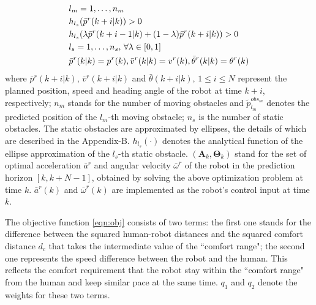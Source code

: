 \documentclass[letterpaper, 10 pt, conference]{ieeeconf}
\begin{document}
\begin{subequations}
\begin{align}
			& l_m=1,\dots,n_m\notag\\
			& h_{l_s}(\bar{p}^r(k+i|k))> 0\label{eqn:constr:safety_s_obs1}\\
			& h_{l_s}(\lambda \bar{p}^r(k+i-1|k)+(1-\lambda)\bar{p}^r(k+i|k))> 0\label{eqn:constr:safety_s_obs2}\\
			& l_s=1,\dots,n_s,\, \forall \lambda\in \left[ 0, 1\right] \notag\\
			& \bar{p}^r(k|k)=p^r(k),\bar{v}^r(k|k)=v^r(k),\bar{\theta}^r(k|k)=\theta^r(k)\label{eqn:constr:init}
		\end{align}
	\end{subequations} \normalsize
	where $\bar{p}^r(k+i|k)$, $\bar{v}^r(k+i|k)$ and $\bar{\theta}(k+i|k),\, 1\le i\le N$ represent the planned position, speed and heading angle of the robot at time $k+i$, respectively;
	$n_m$ stands for the number of moving obstacles and $\tilde{p}^{obs_m}_{l_m}$ denotes the predicted position of the $l_m$-th moving obstacle;
	$n_s$ is the number of static obstacles.
	The static obstacles are approximated by ellipses, the details of which are described in the Appendix-B.
	$h_{l_s}(\cdot)$ denotes the analytical function of the ellipse approximation of the $l_s$-th static obstacle.
	$(\mathbf{A}_k,\mathbf{\Theta}_k)$ stand for the set of optimal acceleration $\bar{a}^r$ and angular velocity $\bar{\omega}^r$ of the robot in the prediction horizon $[k,k+N-1]$, obtained by solving the above optimization problem at time $k$.
	$\bar{a}^r(k)$ and $\bar{\omega}^r(k)$ are implemented as the robot's control input at time $k$.
	
	The objective function \cref{eqn:obj} consists of two terms: the first one stands for the difference between the squared human-robot distances and the squared comfort distance $d_c$ that takes the intermediate value of the ``comfort range"; the second one represents the speed difference between the robot and the human.
	This reflects the comfort requirement that the robot stay within the ``comfort range" from the human and keep similar pace at the same time.
	$q_1$ and $q_2$ denote the weights for these two terms.
	
\end{document}
